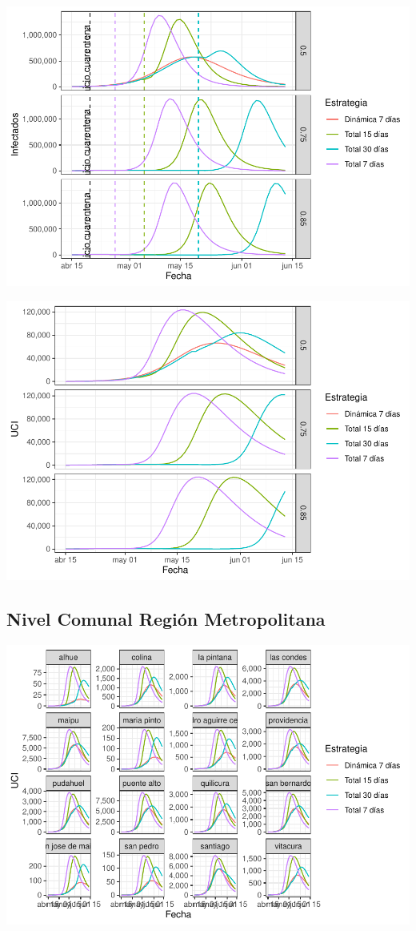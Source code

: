 \documentclass[]{article}
\begin{document}
\includegraphics{Informe_Mesa_2020_04_16_files/figure-latex/unnamed-chunk-6-1.pdf}

\includegraphics{Informe_Mesa_2020_04_16_files/figure-latex/unnamed-chunk-7-1.pdf}

\hypertarget{nivel-comunal-regiuxf3n-metropolitana}{%
\subsection{Nivel Comunal Región Metropolitana}\label{nivel-comunal-regiuxf3n-metropolitana}}

\includegraphics{Informe_Mesa_2020_04_16_files/figure-latex/unnamed-chunk-10-1.pdf}
\end{document}
